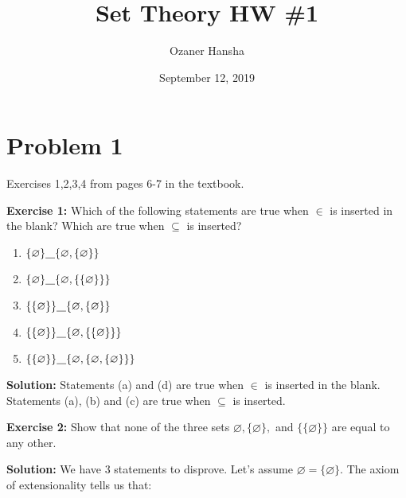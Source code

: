 \documentclass{article}
\begin{document}
\title{Set Theory HW \#1}
\author{Ozaner Hansha}
\date{September 12, 2019}
\maketitle


\newcommand{\pset}[1]{\mathcal P(#1)}
\newcommand{\and}{\wedge}
\newcommand{\OR}{\vee}

\section*{Problem 1}
Exercises 1,2,3,4 from pages 6-7 in the textbook.
\bigskip

\noindent\textbf{Exercise 1:} Which of the following statements are true when $\in$ is inserted in the blank? Which are true when $\subseteq$ is inserted?

\begin{enumerate}[label=(\alph*)]
    \item $\{\varnothing\}\underline{\hspace{3mm}}\{\varnothing,\{\varnothing\}\}$
    \item $\{\varnothing\}\underline{\hspace{3mm}}\{\varnothing,\{\{\varnothing\}\}\}$
    \item $\{\{\varnothing\}\}\underline{\hspace{3mm}}\{\varnothing,\{\varnothing\}\}$
    \item $\{\{\varnothing\}\}\underline{\hspace{3mm}}\{\varnothing,\{\{\varnothing\}\}\}$
    \item $\{\{\varnothing\}\}\underline{\hspace{3mm}}\{\varnothing,\{\varnothing,\{\varnothing\}\}\}$
\end{enumerate}

\noindent\textbf{Solution:} Statements (a) and (d) are true when $\in$ is inserted in the blank. Statements (a), (b) and (c) are true when $\subseteq$ is inserted.
\bigskip

\noindent\textbf{Exercise 2:} Show that none of the three sets $\varnothing, \{\varnothing\},$ and $\{\{\varnothing\}\}$ are equal to any other.
\bigskip

\noindent\textbf{Solution:} We have 3 statements to disprove. Let's assume $\varnothing=\{\varnothing\}$. The axiom of extensionality tells us that:
\end{document}

